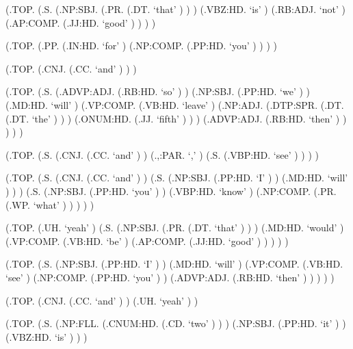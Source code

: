 \documentclass[10pt]{article}
\begin{document}
\begin{parsetree}  (.TOP. (.S. (.NP:SBJ. (.PR. (.DT. `that' ) ) ) (.VBZ:HD. `is' ) (.RB:ADJ. `not' ) (.AP:COMP. (.JJ:HD. `good' ) ) ) ) \end{parsetree}

\begin{parsetree}  (.TOP. (.PP. (.IN:HD. `for' ) (.NP:COMP. (.PP:HD. `you' ) ) ) ) \end{parsetree}

\begin{parsetree}  (.TOP. (.CNJ. (.CC. `and' ) ) ) \end{parsetree}

\begin{parsetree}  (.TOP. (.S. (.ADVP:ADJ. (.RB:HD. `so' ) ) (.NP:SBJ. (.PP:HD. `we' ) ) (.MD:HD. `will' ) (.VP:COMP. (.VB:HD. `leave' ) (.NP:ADJ. (.DTP:SPR. (.DT. (.DT. `the' ) ) ) (.ONUM:HD. (.JJ. `fifth' ) ) ) (.ADVP:ADJ. (.RB:HD. `then' ) ) ) ) ) \end{parsetree}

\begin{parsetree}  (.TOP. (.S. (.CNJ. (.CC. `and' ) ) (.,:PAR. `,' ) (.S. (.VBP:HD. `see' ) ) ) ) \end{parsetree}

\begin{parsetree}  (.TOP. (.S. (.CNJ. (.CC. `and' ) ) (.S. (.NP:SBJ. (.PP:HD. `I' ) ) (.MD:HD. `will' ) ) ) (.S. (.NP:SBJ. (.PP:HD. `you' ) ) (.VBP:HD. `know' ) (.NP:COMP. (.PR. (.WP. `what' ) ) ) ) ) \end{parsetree}

\begin{parsetree}  (.TOP. (.UH. `yeah' ) (.S. (.NP:SBJ. (.PR. (.DT. `that' ) ) ) (.MD:HD. `would' ) (.VP:COMP. (.VB:HD. `be' ) (.AP:COMP. (.JJ:HD. `good' ) ) ) ) ) \end{parsetree}

\begin{parsetree}  (.TOP. (.S. (.NP:SBJ. (.PP:HD. `I' ) ) (.MD:HD. `will' ) (.VP:COMP. (.VB:HD. `see' ) (.NP:COMP. (.PP:HD. `you' ) ) (.ADVP:ADJ. (.RB:HD. `then' ) ) ) ) ) \end{parsetree}

\begin{parsetree}  (.TOP. (.CNJ. (.CC. `and' ) ) (.UH. `yeah' ) ) \end{parsetree}

\begin{parsetree}  (.TOP. (.S. (.NP:FLL. (.CNUM:HD. (.CD. `two' ) ) ) (.NP:SBJ. (.PP:HD. `it' ) ) (.VBZ:HD. `is' ) ) ) \end{parsetree}
\end{document}
